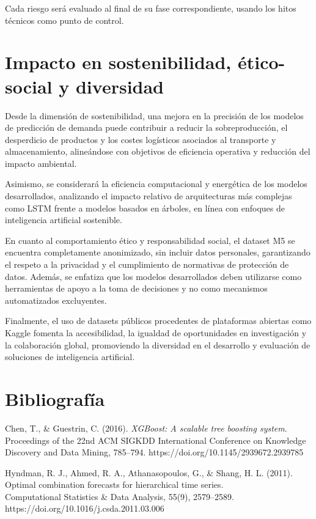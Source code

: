 \documentclass[IB,BIB]{TFUOC}%
\begin{document}
Cada riesgo será evaluado al final de su fase correspondiente, usando
los hitos técnicos como punto de control.

\newpage
\section{Impacto en sostenibilidad, ético-social y diversidad}

Desde la dimensión de sostenibilidad, una mejora en la precisión de los
modelos de predicción de demanda puede contribuir a reducir la
sobreproducción, el desperdicio de productos y los costes logísticos
asociados al transporte y almacenamiento, alineándose con objetivos de
eficiencia operativa y reducción del impacto ambiental.

Asimismo, se considerará la eficiencia computacional y energética de los
modelos desarrollados, analizando el impacto relativo de arquitecturas
más complejas como LSTM frente a modelos basados en árboles, en línea
con enfoques de inteligencia artificial sostenible.

En cuanto al comportamiento ético y responsabilidad social, el dataset
M5 se encuentra completamente anonimizado, sin incluir datos personales,
garantizando el respeto a la privacidad y el cumplimiento de normativas
de protección de datos. Además, se enfatiza que los modelos
desarrollados deben utilizarse como herramientas de apoyo a la toma de
decisiones y no como mecanismos automatizados excluyentes.

Finalmente, el uso de datasets públicos procedentes de plataformas
abiertas como Kaggle fomenta la accesibilidad, la igualdad de
oportunidades en investigación y la colaboración global, promoviendo la
diversidad en el desarrollo y evaluación de soluciones de inteligencia
artificial.

\newpage

\section*{Bibliografía}

Chen, T., \& Guestrin, C. (2016). \emph{XGBoost: A scalable tree
boosting system}. Proceedings of the 22nd ACM SIGKDD International
Conference on Knowledge Discovery and Data Mining, 785--794.
https://doi.org/10.1145/2939672.2939785

Hyndman, R. J., Ahmed, R. A., Athanasopoulos, G., \& Shang, H. L.
(2011).\\
Optimal combination forecasts for hierarchical time series.\\
Computational Statistics \& Data Analysis, 55(9), 2579--2589.\\
https://doi.org/10.1016/j.csda.2011.03.006
\end{document}
